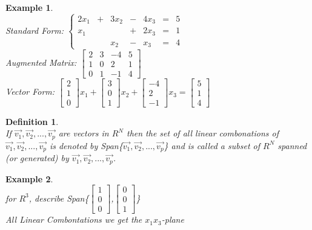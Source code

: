 \documentclass[a4paper,12pt,openany]{book}
\theoremstyle{defn}
\newtheorem{defn}{Definition}[section]
\theoremstyle{expl}
\newtheorem{expl}{Example}[section]
\begin{document}
\begin{expl}\-\\
\textup{
Standard Form: $\left\{ \begin{array}{ccccccc}
2x_1&+&3x_2&-&4x_3&=&5\\
x_1& & &+& 2x_3&=&1\\
 & & x_2 & - &x_3&=&4
\end{array}
\right.$\\
Augmented Matrix:
$\left[ \begin{array}{ccc|c}
2&3&-4&5\\
1&0&2&1\\
0&1&-1&4
\end{array}
\right]$\\
Vector Form:
$\left[ \begin{array}{c} 2\\1\\0 \end{array} \right]x_1+
\left[ \begin{array}{c} 3\\0\\1 \end{array} \right]x_2+
\left[ \begin{array}{c} -4\\2\\-1 \end{array} \right]x_3=
\left[ \begin{array}{c} 5\\1\\4 \end{array} \right]$
}\end{expl}
\begin{defn}\-\\
\textup{
If $\vec{v_1},\vec{v_2},...,\vec{v_p}$ are vectors in $R^N$ then the set of all linear combonations of $\vec{v_1},\vec{v_2},...,\vec{v_p}$ is denoted by Span\{$\vec{v_1},\vec{v_2},...,\vec{v_p}$\} and is called a subset of $R^N$ spanned (or generated) by $\vec{v_1},\vec{v_2},...,\vec{v_p}$.
}\end{defn}
\begin{expl}\-\\
\textup{
for $R^3$, describe Span\{$\left[\begin{array}{c}1\\0\\0\end{array}\right]$,$\left[\begin{array}{c}0\\0\\1\end{array}\right]$\}\\
All Linear Combontations we get the $x_1x_3$-plane\\
}\end{expl}
\end{document}
